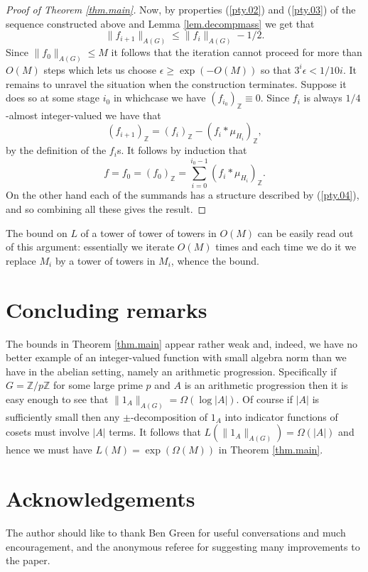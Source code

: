 \documentclass[12pt]{amsart}
\numberwithin{equation}{section}
\theoremstyle{plain}
\theoremstyle{definition}
\renewcommand{\leq}{\leqslant}
\renewcommand{\geq}{\geqslant}
\newcommand{\Z}{\mathbb{Z}}
\begin{document}
\begin{proof}[Proof of Theorem \ref{thm.main}]
Now, by properties (\ref{pty.02}) and (\ref{pty.03}) of the sequence constructed above and Lemma \ref{lem.decompmass} we get that
\begin{equation*}
\|f_{i+1}\|_{A(G)} \leq \|f_i\|_{A(G)} - 1/2.
\end{equation*}
Since $\|f_0\|_{A(G)} \leq M$ it follows that the iteration cannot proceed for more than $O(M)$ steps which lets us choose $\epsilon \geq \exp(-O(M))$ so that $3^i\epsilon < 1/10i$. It remains to unravel the situation when the construction terminates.  Suppose it does so at some stage $i_0$ in whichcase we have $(f_{i_0})_\Z \equiv 0$.  Since $f_i$ is always $1/4$-almost integer-valued we have that
\begin{equation*}
(f_{i+1})_\Z =( f_i)_\Z-(f_i \ast \mu_{H_i})_\Z,
\end{equation*}
by the definition of the $f_i$s. It follows by induction that
\begin{equation*}
f=f_0=(f_0)_\Z=\sum_{i=0}^{i_0-1}{(f_i \ast \mu_{H_i})_\Z}.
\end{equation*}
On the other hand each of the summands has a structure described by (\ref{pty.04}), and so combining all these gives the result.
 \end{proof}
The bound on $L$ of a tower of tower of towers in $O(M)$ can be easily read out of this argument: essentially we iterate $O(M)$ times and each time we do it we replace $M_i$ by a tower of towers in $M_i$, whence the bound.

\section{Concluding remarks}\label{sec.con}

The bounds in Theorem \ref{thm.main} appear rather weak and, indeed, we have no better example of an integer-valued function with small algebra norm than we have in the abelian setting, namely an arithmetic progression. Specifically if $G=\Z/p\Z$ for some large prime $p$ and $A$ is an arithmetic progression then it is easy enough to see that $\|1_A\|_{A(G)} = \Omega(\log |A|)$.  Of course if $|A|$ is sufficiently small then any $\pm$-decomposition of $1_A$ into indicator functions of cosets must involve $|A|$ terms.  It follows that $L(\|1_A\|_{A(G)}) = \Omega(|A|)$ and hence we must have $L(M)=\exp(\Omega(M))$ in Theorem \ref{thm.main}.


\section*{Acknowledgements}

The author should like to thank Ben Green for useful conversations and much encouragement, and the anonymous referee for suggesting many improvements to the paper.




\end{document}
